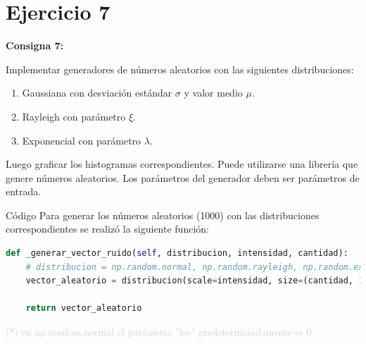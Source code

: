 \documentclass{beamer}
\begin{document}
\section{Ejercicio 7}

\begin{frame}
	\begin{center}
		\textcolor{unahurverde}{\textbf{Consigna 7:}}
	\end{center}
	\justifying
	
	Implementar generadores de números aleatorios con las siguientes distribuciones:
	
	\begin{enumerate}%
		\item Gaussiana con desviación estándar $\sigma$ y valor medio $\mu$.
		\item Rayleigh con parámetro $\xi$.
		\item Exponencial con parámetro $\lambda$.
	\end{enumerate}
	
	\vspace{0.3cm}
	
	Luego graficar los histogramas correspondientes.  
	Puede utilizarse una librería que genere números aleatorios.  
	Los parámetros del generador deben ser parámetros de entrada.
\end{frame}

\begin{frame}[fragile]{Código}
	\justifying
	Para generar los números aleatorios (1000) con las distribuciones correspondientes se realizó la siguiente función:
	
	\begin{lstlisting}[language=Python]
def _generar_vector_ruido(self, distribucion, intensidad, cantidad):
	# distribucion = np.random.normal, np.random.rayleigh, np.random.exponential
	vector_aleatorio = distribucion(scale=intensidad, size=(cantidad, 1))
	
	return vector_aleatorio
	\end{lstlisting}
	
	\vfill
	\footnotesize \textcolor{lightgray}{(*) en np.random.normal el parámetro "loc" predeterminadamente es 0.}
\end{frame}
\end{document}
